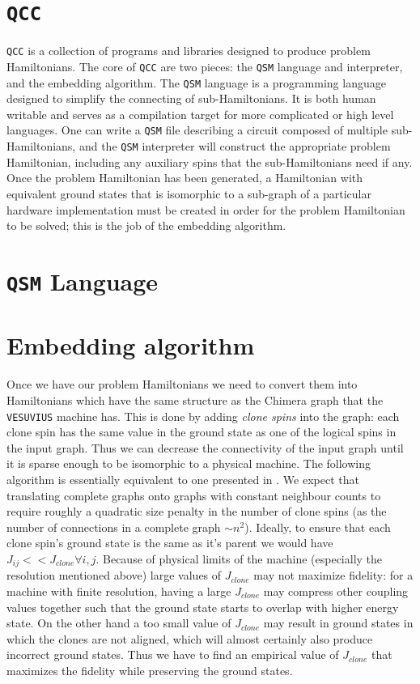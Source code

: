 \section{\texttt{QCC}}
\texttt{QCC} is a collection of programs and libraries designed to produce problem Hamiltonians.  The core of \texttt{QCC} are two pieces: the \texttt{QSM} language and interpreter, and the embedding algorithm.  The \texttt{QSM} language is a programming language designed to simplify the connecting of sub-Hamiltonians.  It is both human writable and serves as a compilation target for more complicated or high level languages.  One can write a \texttt{QSM} file describing a circuit composed of multiple sub-Hamiltonians, and the \texttt{QSM} interpreter will construct the appropriate problem Hamiltonian, including any auxiliary spins that the sub-Hamiltonians need if any.  Once the problem Hamiltonian has been generated, a Hamiltonian with equivalent ground states that is isomorphic to a sub-graph of a particular hardware implementation must be created in order for the problem Hamiltonian to be solved; this is the job of the embedding algorithm.

\section{\texttt{QSM} Language}

\section{Embedding algorithm}
\label{sec:embed_algo}
Once we have our problem Hamiltonians we need to convert them into Hamiltonians which have the same structure as the Chimera graph that the \texttt{VESUVIUS} machine has.  This is done by adding \emph{clone spins} into the graph: each clone spin has the same value in the ground state as one of the logical spins in the input graph.  
Thus we can decrease the connectivity of the input graph until it is sparse enough to be isomorphic to a physical machine.  The following algorithm is essentially equivalent to one presented in \cite{choi1}.
We expect that translating complete graphs onto graphs with constant neighbour counts to require roughly a quadratic size penalty in the number of clone spins (as the number of connections in a complete graph $\sim n^2$).
Ideally, to ensure that each clone spin's ground state is the same as it's parent we would have $J_{ij} << J_{clone} \forall i,j$.  Because of physical limits of the machine (especially the resolution mentioned above) large values of $J_{clone}$ may not maximize fidelity: for a machine with finite resolution, having a large $J_{clone}$ may compress other coupling values together such that the ground state starts to overlap with higher energy state.  On the other hand a too small value of $J_{clone}$ may result in ground states in which the clones are not aligned, which will almost certainly also produce incorrect ground states. Thus we have to find an empirical value of $J_{clone}$ that maximizes the fidelity while preserving the ground states.

